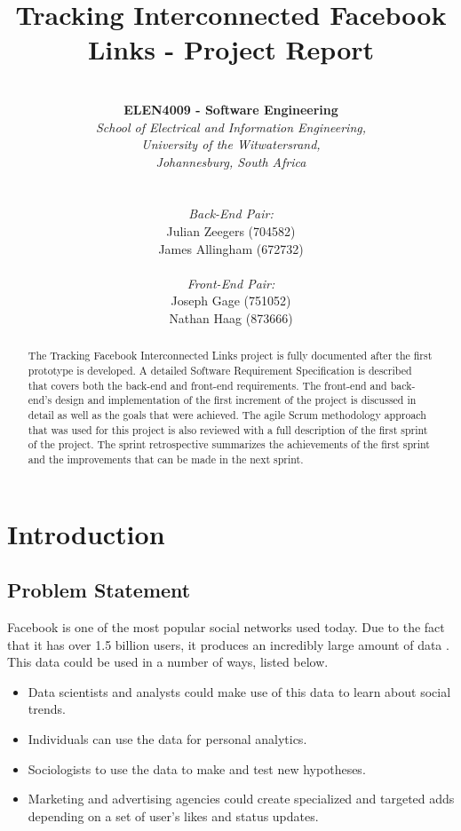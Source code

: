 \documentclass[12pt,onecolumn]{article}
\title{\huge Tracking Interconnected Facebook Links - Project Report}
\author{ \horrule{1pt} \\ \textbf{ELEN4009 - Software Engineering} \\ \emph{School of Electrical and Information Engineering,} \\ \emph{University of the Witwatersrand,} \\ \emph{Johannesburg, South Africa} \\ \horrule{1pt} \\\\ \emph{Back-End Pair:} \\ Julian Zeegers (704582) \\ James Allingham (672732) \\ \\ \emph{Front-End Pair:} \\ Joseph Gage (751052)\\ Nathan Haag (873666) \\ \horrule{1pt}}
\begin{document}
	
	\date{\vspace{-5ex}}
	\maketitle
	\pagestyle{plain}
	\thispagestyle{empty}
	
	\begin{abstract}
		The Tracking Facebook Interconnected Links project is fully documented after the first prototype is developed. A detailed Software Requirement Specification is described that covers both the back-end and front-end requirements. The front-end and back-end's design and implementation of the first increment of the project is discussed in detail as well as the goals that were achieved. The agile Scrum methodology approach that was used for this project is also reviewed with a full description of the first sprint of the project. The sprint retrospective summarizes the achievements of the first sprint and the improvements that can be made in the next sprint. 
	\end{abstract}
	
	\newpage
	
	\tableofcontents
	\listoffigures
	\listoftables
	\thispagestyle{empty}
	\setcounter{page}{0}
	
	\newpage
	
	\section{Introduction}
	
	\subsection{Problem Statement} %
	
	Facebook is one of the most popular social networks used today. Due to the fact that it has over 1.5 billion users, it produces an incredibly large amount of data \cite{fb}. This data could be used in a number of ways, listed below.
	
	\begin{itemize}
		\item Data scientists and analysts could make use of this data to learn about social trends.
		
		\item Individuals can use the data for personal analytics.
		
		\item Sociologists to use the data to make and test new hypotheses.
		
		\item Marketing and advertising agencies could create specialized and targeted adds depending on a set of user's likes and status updates.
		
	\end{itemize}    
	
\end{document}
